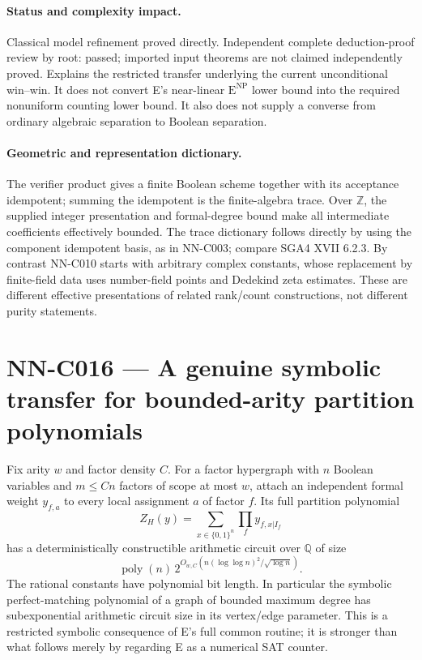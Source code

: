 \paragraph{Status and complexity impact.}
Classical model refinement proved directly. Independent complete deduction-proof review by root: passed; imported input theorems are not claimed independently proved. Explains the restricted transfer underlying the current unconditional win--win. It does not convert E's near-linear $\mathrm E^{\mathrm{NP}}$ lower bound into the required nonuniform counting lower bound. It also does not supply a converse from ordinary algebraic separation to Boolean separation.

\paragraph{Geometric and representation dictionary.}
The verifier product gives a finite Boolean scheme together with its acceptance idempotent; summing the idempotent is the finite-algebra trace. Over $\mathbb Z$, the supplied integer presentation and formal-degree bound make all intermediate coefficients effectively bounded. The trace dictionary follows directly by using the component idempotent basis, as in NN-C003; compare SGA4 XVII 6.2.3. By contrast NN-C010 starts with arbitrary complex constants, whose replacement by finite-field data uses number-field points and Dedekind zeta estimates. These are different effective presentations of related rank/count constructions, not different purity statements.



\section{NN-C016 --- A genuine symbolic transfer for bounded-arity partition polynomials}
\begin{proposition}[NN-C016]
Fix arity $w$ and factor density $C$. For a factor hypergraph with $n$ Boolean variables and $m\leq Cn$ factors of scope at most $w$, attach an independent formal weight $y_{f,a}$ to every local assignment $a$ of factor $f$. Its full partition polynomial
\[
 Z_H(y)=\sum_{x\in\{0,1\}^n}\prod_f y_{f,x|I_f}
\]
has a deterministically constructible arithmetic circuit over $\mathbb Q$ of size
\[
 \operatorname{poly}(n)\,2^{O_{w,C}(n(\log\log n)^2/\sqrt{\log n})}.
\]
The rational constants have polynomial bit length. In particular the symbolic perfect-matching polynomial of a graph of bounded maximum degree has subexponential arithmetic circuit size in its vertex/edge parameter. This is a restricted symbolic consequence of E's full common routine; it is stronger than what follows merely by regarding E as a numerical SAT counter.
\end{proposition}
